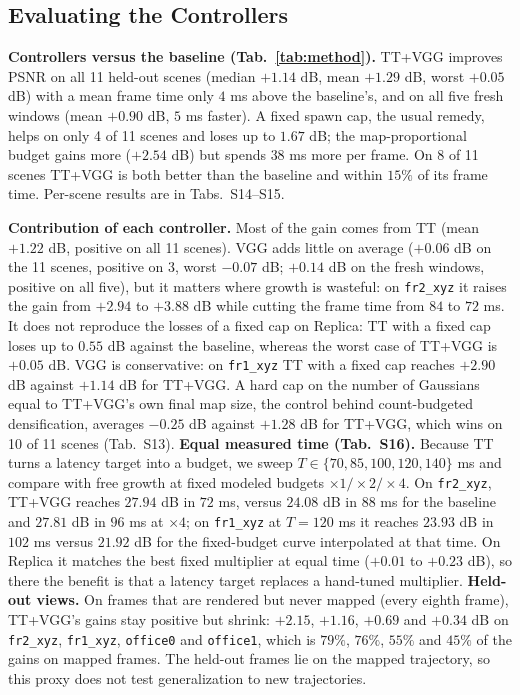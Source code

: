 \subsection{Evaluating the Controllers}
\label{sec:oldeval}
\textbf{Controllers versus the baseline (Tab.~\ref{tab:method}).}
TT+VGG improves PSNR on all 11 held-out scenes (median $+1.14$ dB, mean $+1.29$ dB, worst $+0.05$ dB) with a mean frame time only $4$ ms above the baseline's, and on all five fresh windows (mean $+0.90$ dB, $5$ ms faster). A fixed spawn cap, the usual remedy, helps on only 4 of 11 scenes and loses up to $1.67$ dB; the map-proportional budget gains more ($+2.54$ dB) but spends $38$ ms more per frame. On 8 of 11 scenes TT+VGG is both better than the baseline and within $15\%$ of its frame time. Per-scene results are in Tabs.~S14--S15.

\textbf{Contribution of each controller.}
Most of the gain comes from TT (mean $+1.22$ dB, positive on all 11 scenes). VGG adds little on average ($+0.06$ dB on the 11 scenes, positive on 3, worst $-0.07$ dB; $+0.14$ dB on the fresh windows, positive on all five), but it matters where growth is wasteful: on \texttt{fr2\_xyz} it raises the gain from $+2.94$ to $+3.88$ dB while cutting the frame time from $84$ to $72$ ms. It does not reproduce the losses of a fixed cap on Replica: TT with a fixed cap loses up to $0.55$ dB against the baseline, whereas the worst case of TT+VGG is $+0.05$ dB. VGG is conservative: on \texttt{fr1\_xyz} TT with a fixed cap reaches $+2.90$ dB against $+1.14$ dB for TT+VGG. A hard cap on the number of Gaussians equal to TT+VGG's own final map size, the control behind count-budgeted densification, averages $-0.25$ dB against $+1.28$ dB for TT+VGG, which wins on 10 of 11 scenes (Tab.~S13).
\textbf{Equal measured time (Tab.~S16).}
Because TT turns a latency target into a budget, we sweep $T\in\{70,85,100,120,140\}$ ms and compare with free growth at fixed modeled budgets $\times1/\times2/\times4$. On \texttt{fr2\_xyz}, TT+VGG reaches $27.94$ dB in $72$ ms, versus $24.08$ dB in $88$ ms for the baseline and $27.81$ dB in $96$ ms at $\times4$; on \texttt{fr1\_xyz} at $T=120$ ms it reaches $23.93$ dB in $102$ ms versus $21.92$ dB for the fixed-budget curve interpolated at that time. On Replica it matches the best fixed multiplier at equal time ($+0.01$ to $+0.23$ dB), so there the benefit is that a latency target replaces a hand-tuned multiplier.
\textbf{Held-out views.}
On frames that are rendered but never mapped (every eighth frame), TT+VGG's gains stay positive but shrink: $+2.15$, $+1.16$, $+0.69$ and $+0.34$ dB on \texttt{fr2\_xyz}, \texttt{fr1\_xyz}, \texttt{office0} and \texttt{office1}, which is $79\%$, $76\%$, $55\%$ and $45\%$ of the gains on mapped frames. The held-out frames lie on the mapped trajectory, so this proxy does not test generalization to new trajectories.
